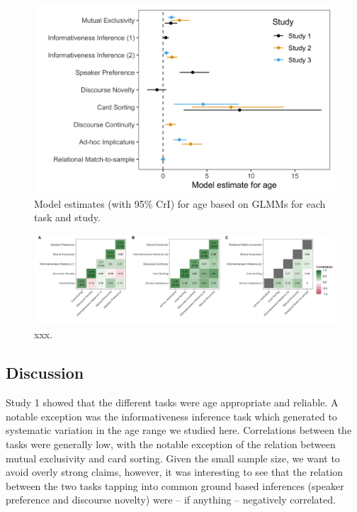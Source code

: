 \documentclass[
  english,
  man,floatsintext]{apa6}
\begin{document}
\begin{figure}

{\centering \includegraphics[width=0.6\linewidth]{./figures/figure3} 

}

\caption{Model estimates (with 95\% CrI) for age based on GLMMs for each task and study.}\label{fig:fig3}
\end{figure}



\begin{figure}

{\centering \includegraphics[width=1\linewidth]{./figures/figure4} 

}

\caption{xxx.}\label{fig:fig4}
\end{figure}

\hypertarget{discussion}{%
\subsection{Discussion}\label{discussion}}

Study 1 showed that the different tasks were age appropriate and reliable. A notable exception was the informativeness inference task which generated to systematic variation in the age range we studied here. Correlations between the tasks were generally low, with the notable exception of the relation between mutual exclusivity and card sorting. Given the small sample size, we want to avoid overly strong claims, however, it was interesting to see that the relation between the two tasks tapping into common ground based inferences (speaker preference and discourse novelty) were -- if anything -- negatively correlated.
\end{document}
